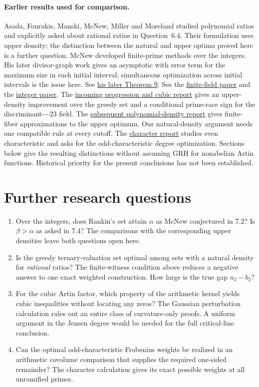 \documentclass[11pt,letterpaper]{article}
\newcommand{\prior}[2]{\href{https://github.com/VladimirReshetnikov/ProveIt/blob/48efe71a726dddc5a505534edaa4c0fd190416b9/docs/incoming/#1}{#2}}
\begin{document}
\paragraph{Earlier results used for comparison.}
Asada, Fourakis, Manski, McNew, Miller and Moreland studied polynomial ratios and explicitly asked about rational ratios in Question~6.4. Their formulation uses upper density; the distinction between the natural and upper optima proved here is a further question. McNew developed finite-prime methods over the integers. His later divisor-graph work gives an asymptotic with error term for the maximum size in each initial interval; simultaneous optimization across initial intervals is the issue here. See \href{https://arxiv.org/abs/1808.04923}{his later Theorem 9}. See the \href{https://arxiv.org/pdf/1512.01932}{finite-field paper} and the \href{https://arxiv.org/abs/1310.2277}{integer paper}. The \prior{grh-progression-densities-and-cubic-prime-race.zip}{incoming progression and cubic report} gives an upper-density improvement over the greedy set and a conditional prime-race sign for the discriminant-$-23$ field. The \prior{grh-methods-polynomial-density.zip}{subsequent polynomial-density report} gives finite-fiber approximations to the upper optimum. Our natural-density argument needs one compatible rule at every cutoff. The \prior{psl2_grh_transfer.zip}{character report} studies even characteristic and asks for the odd-characteristic degree optimization. Sections below give the resulting distinctions without assuming GRH for nonabelian Artin functions. Historical priority for the present conclusions has not been established.









\section{Further research questions}
\begin{enumerate}
\item Over the integers, does Rankin's set attain $\alpha$ as McNew conjectured in 7.2? Is $\beta>\alpha$ as asked in 7.4? The comparisons with the corresponding upper densities leave both questions open here.
\item Is the greedy ternary-valuation set optimal among sets with a natural density for \emph{rational} ratios? The finite-witness condition above reduces a negative answer to one exact weighted construction. How large is the true gap $u_2-b_2$?
\item For the cubic Artin factor, which property of the arithmetic kernel yields cubic inequalities without locating any zeros? The Gaussian perturbation calculation rules out an entire class of curvature-only proofs. A uniform argument in the Jensen degree would be needed for the full critical-line conclusion.
\item Can the optimal odd-characteristic Frobenius weights be realized in an arithmetic covolume comparison that supplies the required one-sided remainder? The character calculation gives its exact possible weights at all unramified primes.
\end{enumerate}
\end{document}

